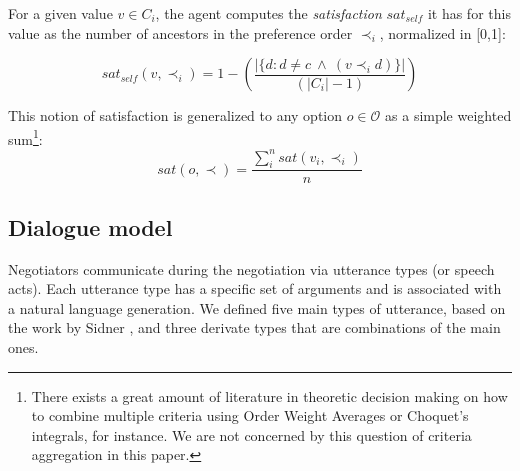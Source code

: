 \documentclass{llncs}
\begin{document}
	For a given value $v\in C_i$, the agent computes the \emph{satisfaction} $sat_{self}$ it has for this value as the number of ancestors in the preference order $\prec_i$, normalized in [0,1]:
	
	\begin{equation}
	sat_{self}(v, \prec_i) =	1 - \left( \frac{|\{d : d \neq c \  \wedge \ (v \prec_i d)\}| }{( |C_i| - 1 )}\right)
	\end{equation}
	
	This notion of satisfaction is generalized to any option $o\in \mathcal{O}$ as a simple weighted sum\footnote{There exists a great amount of literature in theoretic decision making on how to combine multiple criteria using Order Weight Averages or Choquet's integrals, for instance. We are not concerned by this question of criteria aggregation in this paper.}:
	\begin{equation}
	sat(o, \prec) = \frac{\sum_{i}^{n} sat(v_i, \prec_i) }{n}
	\end{equation}
	
	\subsection{Dialogue model}
	Negotiators communicate during the negotiation via utterance types (or speech acts). Each utterance type has a specific set of arguments and is associated with a natural language generation. We defined five main types of utterance, based on the work by Sidner \cite{sidnerartificial}, and three derivate types that are combinations of the main ones.
		
\end{document}
